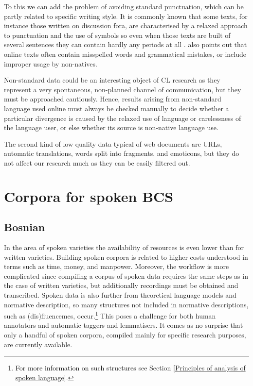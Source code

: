To this we can add the problem of avoiding standard punctuation, which can be partly related to specific writing style. It is commonly known that some texts, for instance those written on discussion fora, are characterised by a relaxed approach to punctuation and the use of symbols so even when those texts are built of several sentences they can contain hardly any periods at all \citep[90]{SchafferBildhauer13}. \citet[43]{Gato14} also points out that online texts often contain misspelled words and grammatical mistakes, or include improper usage by non-natives.

Non-standard data could be an interesting object of CL research as they represent a very spontaneous, non-planned channel of communication, but they must be approached cautiously. Hence, results arising from non-standard language used online must always be checked manually to decide whether a particular divergence is caused by the relaxed use of language or carelessness of the language user, or else whether its source is non-native language use.

The second kind of low quality data typical of web documents are URLs, automatic translations, words split into fragments, and emoticons, but they do not affect our research much as they can be easily filtered out.

\section{Corpora for spoken BCS}
\label{Corpora for spoken BCS}
\subsection{Bosnian}

In the area of spoken varieties the availability of resources is even lower than for written varieties. Building spoken corpora is related to higher costs understood in terms such as time, money, and manpower. Moreover, the workflow is more complicated since compiling a corpus of spoken data requires the same steps as in the case of written varieties, but additionally recordings must be obtained and transcribed. Spoken data is also further from theoretical language models and normative description, so many structures not included in normative descriptions, such as (dis)fluencemes, occur.\footnote{\textcolor{black}{For more information on such structures} see Section \ref{Principles of analysis of spoken language}.} This poses a challenge for both human annotators and automatic taggers and lemmatisers. It comes as no surprise that only a handful of spoken corpora, compiled mainly for specific research purposes, are currently available.

